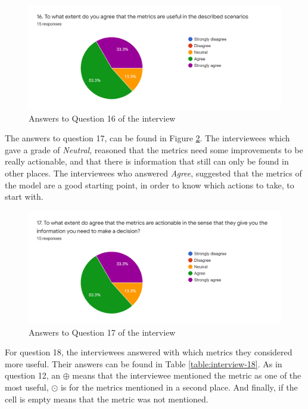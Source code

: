\begin{figure}[ht]
\begin{center}
\includegraphics[width=\textwidth]{figures/interview/Question16.png}
\caption{Answers to Question 16 of the interview}
\label{fig:interview-16}
\end{center}
\end{figure}

The answers to question 17, can be found in Figure \ref{fig:interview-17}. The interviewees which gave a grade of \textit{Neutral}, reasoned that the metrics need some improvements to be really actionable, and that there is information that still can only be found in other places. The interviewees who answered \textit{Agree}, suggested that the metrics of the model are a good starting point, in order to know which actions to take, to start with.

\begin{figure}[ht]
\begin{center}
\includegraphics[width=\textwidth]{figures/interview/Question17.png}
\caption{Answers to Question 17 of the interview}
\label{fig:interview-17}
\end{center}
\end{figure}

For question 18, the interviewees answered with which metrics they considered more useful. Their answers can be found in Table \ref{table:interview-18}. As in question 12, an $\oplus$ means that the interviewee mentioned the metric as one of the most useful, $\odot$ is for the metrics mentioned in a second place. And finally, if the cell is empty means that the metric was not mentioned.

